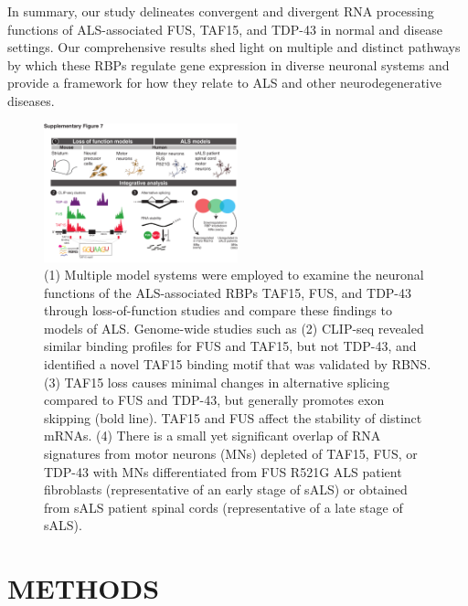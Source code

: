 In summary, our study delineates convergent and divergent RNA processing functions of ALS-associated FUS, TAF15, and TDP-43 in normal and disease settings. Our comprehensive results shed light on multiple and distinct pathways by which these RBPs regulate gene expression in diverse neuronal systems and provide a framework for how they relate to ALS and other neurodegenerative diseases.

\begin{figure}[ht]
  \centering
  \includegraphics[width=0.5\textwidth]{chapter_2_figures/Figure_S7}
  \caption[Supplementary Figure 7. Summary of findings]{(1) Multiple model systems were employed to examine the neuronal functions of the ALS-associated RBPs TAF15, FUS, and TDP-43 through loss-of-function studies and compare these findings to models of ALS. Genome-wide studies such as (2) CLIP-seq revealed similar binding profiles for FUS and TAF15, but not TDP-43, and identified a novel TAF15 binding motif that was validated by RBNS. (3) TAF15 loss causes minimal changes in alternative splicing compared to FUS and TDP-43, but generally promotes exon skipping (bold line). TAF15 and FUS affect the stability of distinct mRNAs. (4) There is a small yet significant overlap of RNA signatures from motor neurons (MNs) depleted of TAF15, FUS, or TDP-43 with MNs differentiated from FUS R521G ALS patient fibroblasts (representative of an early stage of sALS) or obtained from sALS patient spinal cords (representative of a late stage of sALS).}
  \label{fig:Figure_S7}
\end{figure}

\section{METHODS}
